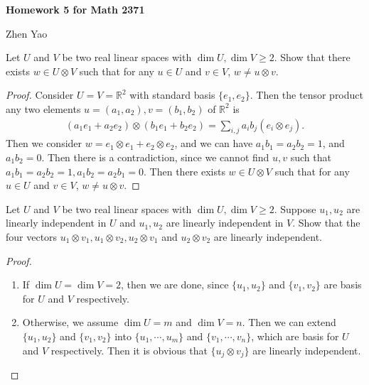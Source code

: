 \documentclass[12pt]{article}
\begin{document}
\centerline{\bf Homework 5 for Math 2371}
\centerline{Zhen Yao}

\medskip

Let $U$ and $V$ be two real linear spaces with $\dim U, \dim V \geq 2$. Show that there exists $w\in U \otimes V$ such that for any $u\in U$ and $v\in V$, $w\neq u \otimes v$.
\begin{proof}
Consider $U = V = \mathbb{R}^2$ with standard basis $\{e_1, e_2\}$. Then the tensor product any two elements $u = (a_1, a_2),v = (b_1, b_2)$ of $\mathbb{R}^2$ is 
\begin{align*}
    (a_1e_1 + a_2e_2) \otimes (b_1e_1 + b_2e_2) = \sum_{i,j}a_i b_j (e_i \otimes e_j).
\end{align*}
Then we consider $w = e_1 \otimes e_1 + e_2 \otimes e_2$, and we can have $a_1b_1 = a_2b_2 = 1$, and $a_1b_2 = 0$. Then there is a contradiction, since we cannot find $u,v$ such that $a_1b_1 = a_2b_2 = 1, a_1b_2 = a_2b_1 = 0$. Then there exists $w \in U \otimes V$ such that for any $u\in U$ and $v\in V$, $w\neq u \otimes v$.
\end{proof}

\medskip

Let $U$ and $V$ be two real linear spaces with $\dim U, \dim V \geq 2$. Suppose $u_1, u_2$ are linearly independent in $U$ and $u_1, u_2$ are linearly independent in $V$. Show that the four vectors $u_1\otimes v_1, u_1\otimes v_2, u_2\otimes v_1$ and $u_2\otimes v_2$ are linearly independent.
\begin{proof}
~\begin{enumerate}[label=(\arabic*)]
    \item If $\dim U = \dim V = 2$, then we are done, since $\{u_1,u_2\}$ and $\{v_1,v_2\}$ are basis for $U$ and $V$ respectively. 
    \item Otherwise, we assume $\dim U = m$ and $\dim V = n$. Then we can extend $\{u_1,u_2\}$ and $\{v_1,v_2\}$ into $\{u_1,\cdots,u_m\}$ and $\{v_1,\cdots,v_n\}$, which are basis for $U$ and $V$ respectively. Then it is obvious that $\{u_j\otimes v_j\}$ are linearly independent.
\end{enumerate}
\end{proof}

\medskip
\end{document}
